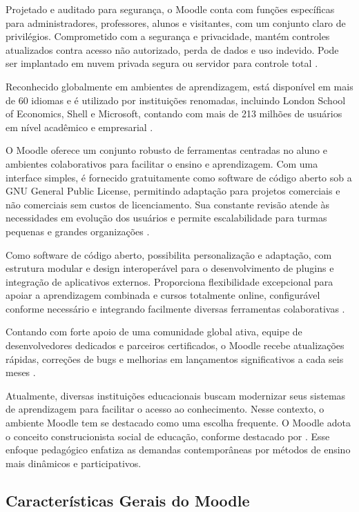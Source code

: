 Projetado e auditado para segurança, o Moodle conta com funções específicas para administradores, professores, alunos e visitantes, com um conjunto claro de privilégios. Comprometido com a segurança e privacidade, mantém controles atualizados contra acesso não autorizado, perda de dados e uso indevido. Pode ser implantado em nuvem privada segura ou servidor para controle total \cite{moodle}. 

Reconhecido globalmente em ambientes de aprendizagem, está disponível em mais de 60 idiomas e é utilizado por instituições renomadas, incluindo London School of Economics, Shell e Microsoft, contando com mais de 213 milhões de usuários em nível acadêmico e empresarial \cite{moodle}. 

O Moodle oferece um conjunto robusto de ferramentas centradas no aluno e ambientes colaborativos para facilitar o ensino e aprendizagem. Com uma interface simples, é fornecido gratuitamente como software de código aberto sob a GNU General Public License, permitindo adaptação para projetos comerciais e não comerciais sem custos de licenciamento. Sua constante revisão atende às necessidades em evolução dos usuários e permite escalabilidade para turmas pequenas e grandes organizações \cite{moodle}. 

Como software de código aberto, possibilita personalização e adaptação, com estrutura modular e design interoperável para o desenvolvimento de plugins e integração de aplicativos externos. Proporciona flexibilidade excepcional para apoiar a aprendizagem combinada e cursos totalmente online, configurável conforme necessário e integrando facilmente diversas ferramentas colaborativas \cite{moodle}. 

Contando com forte apoio de uma comunidade global ativa, equipe de desenvolvedores dedicados e parceiros certificados, o Moodle recebe atualizações rápidas, correções de bugs e melhorias em lançamentos significativos a cada seis meses \cite{moodle}.

Atualmente, diversas instituições educacionais buscam modernizar seus sistemas de aprendizagem para facilitar o acesso ao conhecimento. Nesse contexto, o ambiente Moodle tem se destacado como uma escolha frequente. O Moodle adota o conceito construcionista social de educação, conforme destacado por \cite[p.~22]{galasso}. Esse enfoque pedagógico enfatiza as demandas contemporâneas por métodos de ensino mais dinâmicos e participativos.

\subsection{Características Gerais do Moodle}

